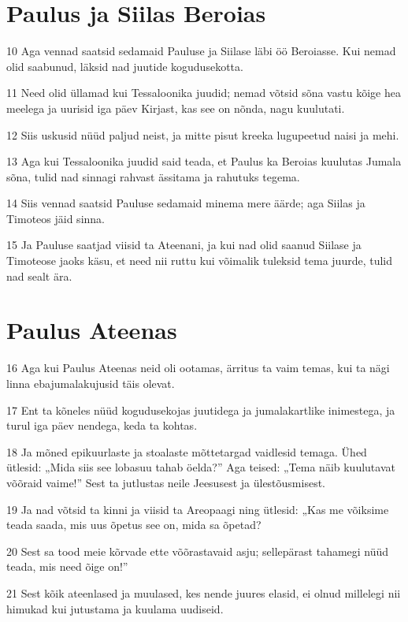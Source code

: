 \section*{Paulus ja Siilas Beroias}

\par 10 Aga vennad saatsid sedamaid Pauluse ja Siilase läbi öö Beroiasse. Kui nemad olid saabunud, läksid nad juutide kogudusekotta.
\par 11 Need olid üllamad kui Tessaloonika juudid; nemad võtsid sõna vastu kõige hea meelega ja uurisid iga päev Kirjast, kas see on nõnda, nagu kuulutati.
\par 12 Siis uskusid nüüd paljud neist, ja mitte pisut kreeka lugupeetud naisi ja mehi.
\par 13 Aga kui Tessaloonika juudid said teada, et Paulus ka Beroias kuulutas Jumala sõna, tulid nad sinnagi rahvast ässitama ja rahutuks tegema.
\par 14 Siis vennad saatsid Pauluse sedamaid minema mere äärde; aga Siilas ja Timoteos jäid sinna.
\par 15 Ja Pauluse saatjad viisid ta Ateenani, ja kui nad olid saanud Siilase ja Timoteose jaoks käsu, et need nii ruttu kui võimalik tuleksid tema juurde, tulid nad sealt ära.

\section*{Paulus Ateenas}

\par 16 Aga kui Paulus Ateenas neid oli ootamas, ärritus ta vaim temas, kui ta nägi linna ebajumalakujusid täis olevat.
\par 17 Ent ta kõneles nüüd kogudusekojas juutidega ja jumalakartlike inimestega, ja turul iga päev nendega, keda ta kohtas.
\par 18 Ja mõned epikuurlaste ja stoalaste mõttetargad vaidlesid temaga. Ühed ütlesid: „Mida siis see lobasuu tahab öelda?” Aga teised: „Tema näib kuulutavat võõraid vaime!” Sest ta jutlustas neile Jeesusest ja ülestõusmisest.
\par 19 Ja nad võtsid ta kinni ja viisid ta Areopaagi ning ütlesid: „Kas me võiksime teada saada, mis uus õpetus see on, mida sa õpetad?
\par 20 Sest sa tood meie kõrvade ette võõrastavaid asju; sellepärast tahamegi nüüd teada, mis need õige on!”
\par 21 Sest kõik ateenlased ja muulased, kes nende juures elasid, ei olnud millelegi nii himukad kui jutustama ja kuulama uudiseid.

